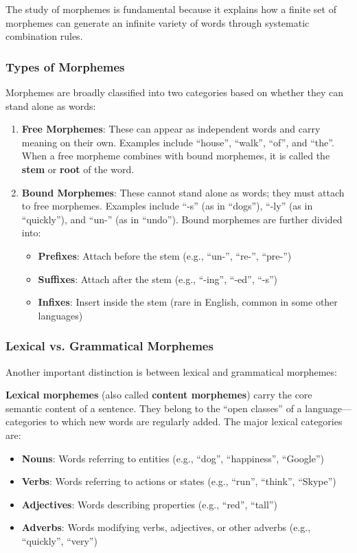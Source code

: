 \documentclass[11pt,a4paper]{article}
\begin{document}
The study of morphemes is fundamental because it explains how a finite set of morphemes can generate an infinite variety of words through systematic combination rules.

\subsubsection{Types of Morphemes}

Morphemes are broadly classified into two categories based on whether they can stand alone as words:

\begin{enumerate}
    \item \textbf{Free Morphemes}: These can appear as independent words and carry meaning on their own. Examples include ``house'', ``walk'', ``of'', and ``the''. When a free morpheme combines with bound morphemes, it is called the \textbf{stem} or \textbf{root} of the word.
    \item \textbf{Bound Morphemes}: These cannot stand alone as words; they must attach to free morphemes. Examples include ``-s'' (as in ``dogs''), ``-ly'' (as in ``quickly''), and ``un-'' (as in ``undo''). Bound morphemes are further divided into:
    \begin{itemize}
        \item \textbf{Prefixes}: Attach before the stem (e.g., ``un-'', ``re-'', ``pre-'')
        \item \textbf{Suffixes}: Attach after the stem (e.g., ``-ing'', ``-ed'', ``-s'')
        \item \textbf{Infixes}: Insert inside the stem (rare in English, common in some other languages)
    \end{itemize}
\end{enumerate}

\subsubsection{Lexical vs. Grammatical Morphemes}

Another important distinction is between lexical and grammatical morphemes:

\textbf{Lexical morphemes} (also called \textbf{content morphemes}) carry the core semantic content of a sentence. They belong to the ``open classes'' of a language---categories to which new words are regularly added. The major lexical categories are:
\begin{itemize}
    \item \textbf{Nouns}: Words referring to entities (e.g., ``dog'', ``happiness'', ``Google'')
    \item \textbf{Verbs}: Words referring to actions or states (e.g., ``run'', ``think'', ``Skype'')
    \item \textbf{Adjectives}: Words describing properties (e.g., ``red'', ``tall'')
    \item \textbf{Adverbs}: Words modifying verbs, adjectives, or other adverbs (e.g., ``quickly'', ``very'')
\end{itemize}
\end{document}
